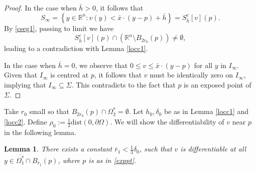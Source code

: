 \documentclass[10pt,a4paper]{amsart}
\theoremstyle{plain}
\newtheorem{lemma}{Lemma}[section]
\newcommand{\0}{\textbf{0}}
\numberwithin{equation}{section}
\numberwithin{equation}{section}
\numberwithin{figure}{section}
\begin{document}
\begin{proof}
In the case when \( \bar{h} > 0 \), it follows that
\[
S_\infty = \left\{ y \in \mathbb{R}^n : v(y) < \bar{x} \cdot (y - p) + \bar{h} \right\} = S^c_{\bar{h}}[v](p).
\]
By \eqref{cseg1}, passing to limit we have
\[
S^c_{\bar{h}}[v](p) \cap \left( \mathbb{R}^n \setminus B_{2r_0}(p) \right) \neq \emptyset,
\]
leading to a contradiction with Lemma \ref{locc1}.

In the case when \( \bar{h} = 0 \), we observe that \( 0 \leq v \leq \bar{x} \cdot (y - p) \) for all \( y \) in \( I_\infty \). Given that \( I_\infty \) is centred at \( p \), it follows that \( v \) must be identically zero on \( I_\infty \), implying that \( I_\infty \subseteq \Sigma \). This contradicts to the fact that $p$ is an exposed point of $\Sigma$.
\end{proof}







Take $r_0$ small so that $B_{2r_0}(p)\cap \Omega_2^*=\emptyset$. Let $h_0, \delta_0$ be as in Lemma \ref{locc1} and \ref{locc2}. Define $\rho_0:=\frac{1}{2}\text{dist}(0,\partial \Omega)$. 
We will show the differentiability of $v$ near $p$ in the following lemma.
\begin{lemma}\label{c1lemma}
There exists a constant $\bar{r}_1<\frac{1}{3}\delta_0$, such that $v$ is differentiable at all $y\in \overline{\Omega_1^*}\cap B_{\bar{r}_1}(p)$, where $p$ is as in \eqref{exppt}. 
\end{lemma}
\end{document}
